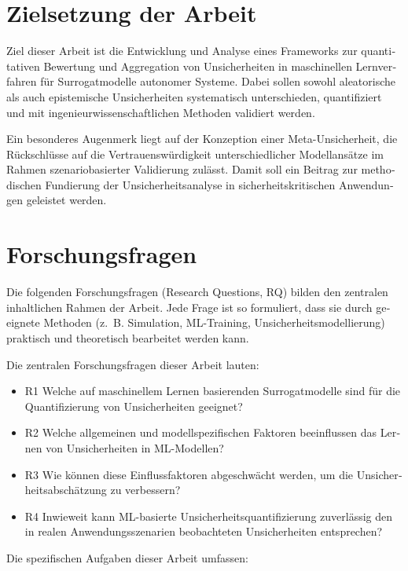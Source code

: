\begin{otherlanguage}{ngerman}
\section{Zielsetzung der Arbeit}

Ziel dieser Arbeit ist die Entwicklung und Analyse eines Frameworks zur quantitativen Bewertung und Aggregation von Unsicherheiten in maschinellen Lernverfahren für Surrogatmodelle autonomer Systeme. Dabei sollen sowohl aleatorische als auch epistemische Unsicherheiten systematisch unterschieden, quantifiziert und mit ingenieurwissenschaftlichen Methoden validiert werden.

Ein besonderes Augenmerk liegt auf der Konzeption einer Meta-Unsicherheit, die Rückschlüsse auf die Vertrauenswürdigkeit unterschiedlicher Modellansätze im Rahmen szenariobasierter Validierung zulässt. Damit soll ein Beitrag zur methodischen Fundierung der Unsicherheitsanalyse in sicherheitskritischen Anwendungen geleistet werden.

\section{Forschungsfragen}

Die folgenden Forschungsfragen (Research Questions, RQ) bilden den zentralen inhaltlichen Rahmen der Arbeit. Jede Frage ist so formuliert, dass sie durch geeignete Methoden (z.~B. Simulation, ML-Training, Unsicherheitsmodellierung) praktisch und theoretisch bearbeitet werden kann. 

Die zentralen Forschungsfragen dieser Arbeit lauten:

\begin{itemize}
  \item {R1} Welche auf maschinellem Lernen basierenden Surrogatmodelle sind für die Quantifizierung von Unsicherheiten geeignet?
  \item {R2} Welche allgemeinen und modellspezifischen Faktoren beeinflussen das Lernen von Unsicherheiten in ML-Modellen?
  \item {R3} Wie können diese Einflussfaktoren abgeschwächt werden, um die Unsicherheitsabschätzung zu verbessern?
  \item {R4} Inwieweit kann ML-basierte Unsicherheitsquantifizierung zuverlässig den in realen Anwendungsszenarien beobachteten Unsicherheiten entsprechen?
\end{itemize}

Die spezifischen Aufgaben dieser Arbeit umfassen:


\end{otherlanguage}
